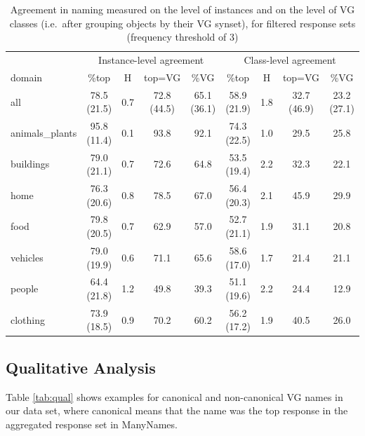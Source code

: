 \begin{table}
\begin{tabular}{lcccc|cccc}
\toprule
 & \multicolumn{4}{c|}{Instance-level agreement} & \multicolumn{4}{c}{Class-level agreement}\\ 
         domain &         \%top &    H &       top=VG &          \%VG &         \%top &    H &       top=VG &          \%VG \\
\midrule
            all &  78.5 (21.5) &  0.7 &  72.8 (44.5) &  65.1 (36.1) &  58.9 (21.9) &  1.8 &  32.7 (46.9) &  23.2 (27.1) \\
 animals\_plants &  95.8 (11.4) &  0.1 &         93.8 &         92.1 &  74.3 (22.5) &  1.0 &         29.5 &         25.8 \\
      buildings &  79.0 (21.1) &  0.7 &         72.6 &         64.8 &  53.5 (19.4) &  2.2 &         32.3 &         22.1 \\
           home &  76.3 (20.6) &  0.8 &         78.5 &         67.0 &  56.4 (20.3) &  2.1 &         45.9 &         29.9 \\
           food &  79.8 (20.5) &  0.7 &         62.9 &         57.0 &  52.7 (21.1) &  1.9 &         31.1 &         20.8 \\
       vehicles &  79.0 (19.9) &  0.6 &         71.1 &         65.6 &  58.6 (17.0) &  1.7 &         21.4 &         21.1 \\
         people &  64.4 (21.8) &  1.2 &         49.8 &         39.3 &  51.1 (19.6) &  2.2 &         24.4 &         12.9 \\
       clothing &  73.9 (18.5) &  0.9 &         70.2 &         60.2 &  56.2 (17.2) &  1.9 &         40.5 &         26.0 \\
\bottomrule
\end{tabular}

\caption{Agreement in naming measured on the level of instances and on the level of VG classes (i.e.\ after grouping objects by their VG synset), for filtered response sets (frequency threshold of 3)}
\label{tab:agree}
\end{table}



\subsection{Qualitative Analysis}

 Table \ref{tab:qual} shows examples for canonical and non-canonical VG names in our data set, where canonical means that the name was the top response in the aggregated response set in ManyNames.

